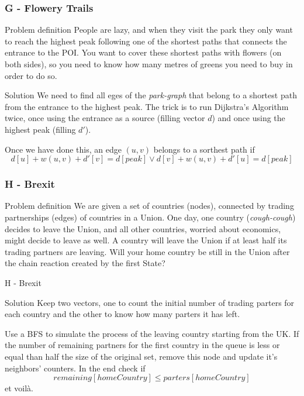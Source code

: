 \documentclass{beamer}
\begin{document}
\begin{frame}
  \frametitle{G - Flowery Trails}
  \begin{block}{Problem definition}
    People are lazy, and when they visit the park they only want to reach the highest peak following one
    of the shortest paths that connects the entrance to the POI. 
    You want to cover these shortest paths with flowers (on both sides), so you need to know how many metres 
    of greens you need to buy in order to do so.
  \end{block}
  \pause
  \begin{block}{Solution}
    We need to find all eges of the \textit{park-graph} that belong to a shortest path from the entrance to the highest peak.
    The trick is to run Dijkstra's Algorithm twice, once using the entrance as a source (filling vector $d$)
    and once using the highest peak (filling $d'$).
    
    Once we have done this, an edge $(u,v)$ belongs to a sorthest path if
    $$d[u]+w(u,v)+d'[v] = d[peak] \lor d[v]+w(u,v)+d'[u] = d[peak]$$
  \end{block}
\end{frame}

\begin{frame}
  \frametitle{H - Brexit}
  \begin{block}{Problem definition}
    We are given a set of countries (nodes), connected by trading partnerships (edges) of countries
    in a Union. One day, one country (\textit{cough-cough}) decides to leave the Union, and all other countries, 
    worried about economics, might decide to leave as well.
    A country will leave the Union if at least half its trading partners are leaving.
    Will your home country be still in the Union after the chain reaction created by the first State?
  \end{block}
\end{frame}
\begin{frame}{H - Brexit}
  \begin{block}{Solution}
    Keep two vectors, one to count the initial number of trading parters for each country and the other to 
    know how many parters it has left.

    Use a BFS to simulate the process of the leaving country starting from the UK. If the number of 
    remaining partners for the first country in the queue is less or equal than half the size of the original 
    set, remove this node and update it's neighbors' counters.
    In the end check if $$remaining[homeCountry] \leq parters[homeCountry]$$ et voilà.
  \end{block}
\end{frame}
\end{document}
